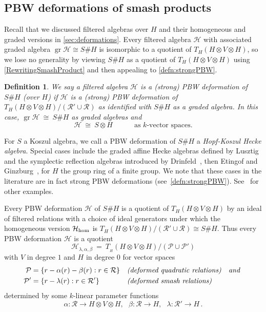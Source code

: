 \documentclass[11pt]{amsart}
\numberwithin{equation}{section}
\newtheorem{definition}[equation]{Definition}
\DeclareMathOperator{\gr}{gr}
\newcommand{\chabl}{\cH_{\lambda,\alpha,\beta}}
\newcommand{\R}{\mathcal{R}}
\renewcommand{\P}{\mathcal{P}}
\newcommand{\hh}{\rm{hom}}
\renewcommand{\_}[1]{\mbox{$_{\left( #1 \right)}$}}
\newcommand{\ot}{\otimes}
\newcommand{\Ho}{H}%
\newcommand{\cH}{\mathcal{H}}
\begin{document}
{\vspace{1ex}

\subsection*{PBW deformations of smash products}
Recall that
we discussed filtered algebras over $H$
and their homogeneous and graded versions
in \cref{sec:deformations}.
Every filtered algebra $\cH$ with associated graded 
algebra $\gr \cH \cong S\# H$ is isomorphic
to a quotient of 
$T_H(H\ot V \ot H)$, so we lose no generality
by viewing $S\# H$ as a quotient of $T_H(H\ot V\ot H)$
using \cref{RewritingSmashProduct}
and then appealing to \cref{defn:strongPBW}.

\vspace{1ex}

  \begin{definition}{\em 
  We say a filtered algebra $\cH$ is a {\em (strong) PBW deformation} of $S\# H$
(over $H$) if $\cH$ is a (strong) PBW deformation of 
$T_{H}(H\ot V \ot H)/(\R' \cup \R)$ as identified with $S\# H$
as a graded algebra.
In this case, 
$\gr \cH \ \cong \ S\# H$ as graded algebras and
 $$\cH \ \cong\ S\ot H\qquad\quad\text{
   as $k$-vector spaces.}
 $$
}
\end{definition}

\vspace{2ex}

For $S$ a Koszul algebra, we call a PBW deformation of $S\# H$ 
 a {\em Hopf-Koszul Hecke algebra}.
 Special cases include the graded affine Hecke algebras defined by 
 Lusztig~\cite{Lusztig88,Lusztig89}
 and the symplectic reflection algebras introduced by
 Drinfeld~\cite{Drinfeld}, then Etingof and Ginzburg~\cite{EG},
for $H$ the group ring of a finite group.
 We note that these cases in the literature are in fact
 strong PBW deformations (see~\cref{defn:strongPBW}).
 See~\cite{EGG05,FlakeSahi,GK07,Khare,KT10,LSS,WW}
 for other examples.

Every PBW deformation $\cH$ of $S\# H$
is a quotient of $T_{H}(H\ot V\ot H)$ by an ideal of
filtered relations
with a choice of ideal generators 
under which the homogeneous version $\cH_{\hh}$
is $T_H(H\ot V \ot H)/(\R' \cup \R)\cong S\# H$.
Thus every PBW deformation $\cH$ is a quotient 
\begin{equation}\label{eqn:Hlab}
   \chabl \ =\ T_{\! _H}(\Ho\ot V \ot \Ho)/ (\P\cup \P')
\end{equation}
with $V$ in degree $1$ and $\Ho$ in degree $0$ for vector spaces
$$
\begin{aligned}
  \P & =  \{ r -\alpha(r)-\beta(r) : r\in \R\} & & \text{\em (deformed
    quadratic relations)\quad and } \\
 \P' & =  \{ r - \lambda(r) : r \in \R' \} & & \text{\em (deformed smash relations)}
\end{aligned}
$$
determined by some $k$-linear parameter functions 
\[
  \alpha: \R\rightarrow \Ho\ot V\ot \Ho , \ \ \
   \beta: \R \rightarrow \Ho , \ \ \
   \lambda: \R'\rightarrow \Ho \, .
 \]

}
\end{document}

